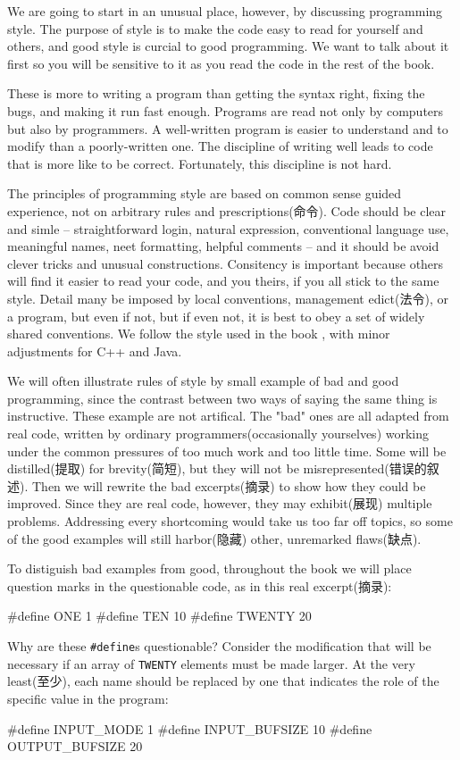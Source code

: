 We are going to start in an unusual place, however, by discussing
programming style. The purpose of style is to make the code easy to read
for yourself and others, and good style is curcial to good programming. We
want to talk about it first so you will be sensitive to it as you read the
code in the rest of the book.

These is more to writing a program than getting the syntax right, fixing
the bugs, and making it run fast enough. Programs are read not only by
computers but also by programmers. A well-written program is easier to
understand and to modify than a poorly-written one. The discipline of
writing well leads to code that is more like to be correct. Fortunately,
this discipline is not hard.

The principles of programming style are based on common sense guided
experience, not on arbitrary rules and prescriptions(命令). Code should be
clear and simle -- straightforward login, natural expression, conventional
language use, meaningful names, neet formatting, helpful comments -- and it
should be avoid clever tricks and unusual constructions. Consitency is
important because others will find it easier to read your code, and you
theirs, if you all stick to the same style. Detail many be imposed by local
conventions, management edict(法令), or a program, but even if not, but if
even not, it is best to obey a set of widely shared conventions. We follow
the style used in the book , with
minor adjustments for C++ and Java.

We will often illustrate rules of style by small example of bad and good
programming, since the contrast between two ways of saying the same thing
is instructive. These example are not artifical. The "bad" ones are all
adapted from real code, written by ordinary programmers(occasionally
yourselves) working under the common pressures of too much work and too
little time. Some will be distilled(提取) for brevity(简短), but they will
not be misrepresented(错误的叙述). Then we will rewrite the bad
excerpts(摘录) to show how they could be improved. Since they are real
code, however, they may exhibit(展现) multiple problems. Addressing every
shortcoming would take us too far off topics, so some of the good examples
will still harbor(隐藏) other, unremarked flaws(缺点).

To distiguish bad examples from good, throughout the book we will place
question marks in the questionable code, as in this real excerpt(摘录):
\begin{badcode}
    #define ONE 1
    #define TEN 10 
    #define TWENTY  20
\end{badcode}
Why are these \verb"#define"s questionable? Consider the modification that
will be necessary if an array of \verb"TWENTY" elements must be made
larger. At the very least(至少), each name should be replaced by one that
indicates the role of the specific value in the program:
\begin{wellcode}
    #define INPUT_MODE  1
    #define INPUT_BUFSIZE   10
    #define OUTPUT_BUFSIZE  20 
\end{wellcode}

